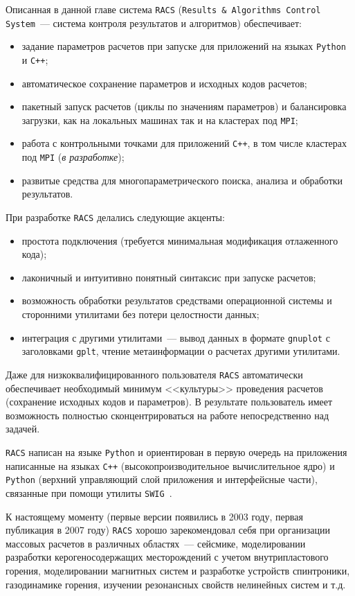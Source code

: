 Описанная в данной главе система {\tt RACS} ({\tt Results \& Algorithms Control System}~--- система контроля
результатов и алгоритмов) обеспечивает:
\begin{itemize}
\item задание параметров расчетов при запуске для приложений на языках \verb'Python' и \verb'C++';
\item автоматическое сохранение параметров и исходных кодов расчетов;
\item пакетный запуск расчетов (циклы по значениям параметров) и балансировка загрузки, как на локальных машинах так и на кластерах под \verb'MPI';
\item работа с контрольными точками для приложений \verb'C++', в том числе кластерах под \verb'MPI' ({\it в разработке});
\item развитые средства для многопараметрического поиска, анализа и обработки результатов.
\end{itemize}

При разработке \verb'RACS' делались следующие акценты:
\begin{itemize}
\item простота подключения (требуется минимальная модификация отлаженного кода);
\item лаконичный и интуитивно понятный синтаксис при запуске расчетов;
\item возможность обработки результатов средствами операционной системы и сторонними утилитами без потери целостности данных;
\item интеграция с другими утилитами~--- вывод данных в формате \verb'gnuplot' с заголовками \verb'gplt',
  чтение метаинформации о расчетах другими утилитами.
\end{itemize}


Даже для низкоквалифицированного
пользователя  {\tt RACS} автоматически обеспечивает необходимый минимум
<<культуры>> проведения расчетов (сохранение исходных кодов  и
параметров).
В результате пользователь имеет
возможность полностью сконцентрироваться на работе непосредственно  над задачей.

\verb'RACS' написан на языке \verb'Python' и ориентирован в первую очередь
на приложения написанные на
языках \verb'C++' (высокопроизводительное вычислительное ядро) и \verb'Python' (верхний управляющий слой приложения и
интерфейсные части), связанные при помощи утилиты \verb'SWIG'~\cite{SWIG}.

К настоящему моменту (первые версии появились в 2003 году, первая публикация \cite{racs:2007} в 2007 году) 
{\tt RACS} хорошо зарекомендовал себя при организации массовых расчетов в различных областях~--- сейсмике,
моделировании разработки керогеносодержащих месторождений с учетом внутрипластового горения,
моделировании магнитных систем и разработке устройств спинтроники, %
газодинамике горения, изучении резонансных свойств нелинейных систем и т.д.

